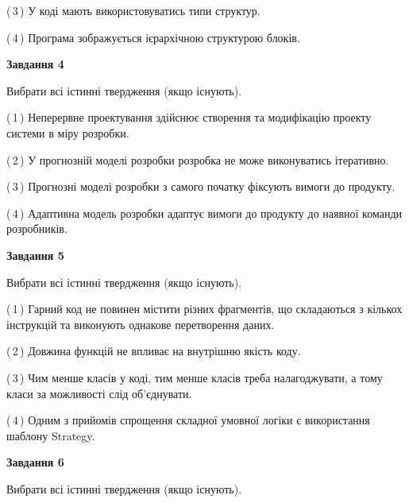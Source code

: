 \documentclass[10pt, ukrainian]{article}
\begin{document}
{\begin {large}
(\,3\,) У коді мають використовуватись типи структур. %



(\,4\,) Програма зображується ієрархічною структурою блоків.%


{\begin {center}\textbf{Завдання 4}\end {center}}\par
Вибрати всі істинні твердження (якщо існують).\par
\vspace{2mm}



(\,1\,) Неперервне проектування здійснює створення та модифікацію проекту системи в міру розробки. %



(\,2\,) У прогнозній моделі розробки розробка не може виконуватись ітеративно. %



(\,3\,) Прогнозні моделі розробки з самого початку фіксують вимоги до продукту. %



(\,4\,) Адаптивна модель розробки адаптує вимоги до продукту до наявної команди розробників. %


{\begin {center}\textbf{Завдання 5}\end {center}}\par
Вибрати всі істинні твердження (якщо існують).\par
\vspace{2mm}



(\,1\,) Гарний код не повинен містити різних фрагментів, що складаються з кількох інструкцій та виконують однакове перетворення даних. %



(\,2\,) Довжина функцій не впливає на внутрішню якість коду. %



(\,3\,) Чим менше класів у коді, тим менше класів треба налагоджувати, а тому класи за можливості слід об'єднувати. %



(\,4\,) Одним з прийомів спрощення складної умовної логіки є використання шаблону Strategy. %

\newpage

{\begin {center}\textbf{Завдання 6}\end {center}}\par
Вибрати всі істинні твердження (якщо існують).\par
\vspace{2mm}




\end{large}}
\end{document}
